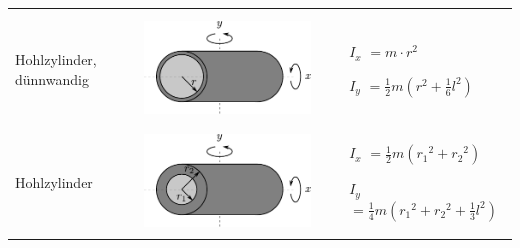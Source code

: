 \begin{table}[h!]
\begin{tabular}{m{2cm} c m{}}
\begin{itemize}
                \end{itemize} \\
& & \\
Hohlzylinder, dünnwandig &
        \begin{minipage}{0.3\textwidth}
        \centering
        \includegraphics[scale=\traegscale]{../fig/traeg-hohlzylinder-duenn.pdf}
        \end{minipage} &
                \begin{itemize}
                \item[$I_x$]$= m \cdot  r^2$
                \item[$I_y$]$= \frac12 m (r^2 + \frac16 l^2)$
                \end{itemize} \\
& & \\
Hohlzylinder &
        \begin{minipage}{0.3\textwidth}
        \centering
        \includegraphics[scale=\traegscale]{../fig/traeg-hohlzylinder.pdf}
        \end{minipage} &
                \begin{itemize}
                \item[$I_x$]$= \frac12 m \left({r_1}^2 + {r_2}^2 \right)$
                \item[$I_y$]$= \frac14 m \left({r_1}^2 + {r_2}^2
                        + \frac13 l^2 \right)$
                \end{itemize}\\

\end{tabular}
\end{table}
